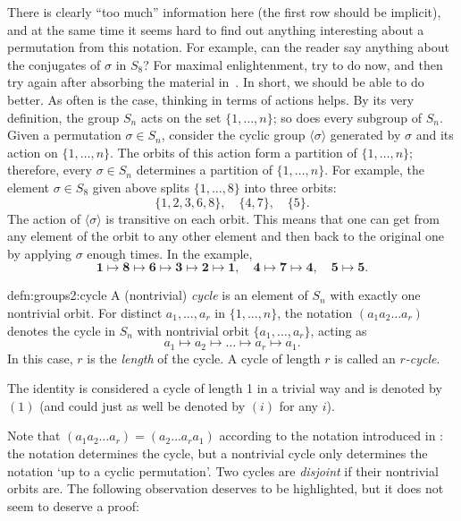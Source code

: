 There is clearly ``too much'' information here (the first row should
be implicit), and at the same time it seems hard to find out anything
interesting about a permutation from this notation. For example, can
the reader say anything about the conjugates of $\sigma$ in $S_8$? For
maximal enlightenment, try to do
 now, and then
try again after absorbing the material
in~. In short, we should be
able to do better.  As often is the case, thinking in terms of actions
helps. By its very definition, the group $S_n$ acts on the set
$\{1,\dots,n\}$; so does every subgroup of $S_n$. Given a permutation
$\sigma \in S_n$, consider the cyclic group $\langle\sigma\rangle$
generated by $\sigma$ and its action on $\{1,\dots,n\}$. The orbits of
this action form a partition of $\{1,\dots,n\}$; therefore, every
$\sigma \in S_n$ determines a partition of $\{1,\dots,n\}$. For
example, the element $\sigma \in S_8$ given above splits
$\{1,\dots,8\}$ into three orbits:
\[
  \{1,2,3,6,8\}, \quad \{4,7\}, \quad \{5\}.
\]
The action of $\langle\sigma\rangle$ is transitive on each orbit. This
means that one can get from any element of the orbit to any other
element and then back to the original one by applying $\sigma$ enough
times. In the example,
\[
  \mathbf{1} \mapsto \mathbf{8} \mapsto \mathbf{6} \mapsto \mathbf{3}
  \mapsto \mathbf{2} \mapsto \mathbf{1}, \quad \mathbf{4} \mapsto
  \mathbf{7} \mapsto \mathbf{4}, \quad \mathbf{5} \mapsto \mathbf{5}.
\]
\begin{defn}{}{defn:groups2:cycle}
  A (nontrivial) \emph{cycle} is an element of $S_n$ with exactly one
  nontrivial orbit. For distinct $a_1, \dots, a_r$ in $\{1,\dots,n\}$,
  the notation $(a_1 a_2 \dots a_r)$ denotes the cycle in $S_n$ with
  nontrivial orbit $\{a_1,\dots,a_r\}$, acting as
  \[
    a_1 \mapsto a_2 \mapsto \dots \mapsto a_r \mapsto a_1.
  \]
  In this case, $r$ is the \emph{length} of the cycle. A cycle of
  length $r$ is called an \emph{$r$-cycle}.
\end{defn}
The identity is considered a cycle of length 1 in a trivial way and is
denoted by $(1)$ (and could just as well be denoted by $(i)$ for any
$i$).

Note that $(a_1 a_2 \dots a_r) = (a_2 \dots a_r a_1)$ according to the
notation introduced in : the notation
determines the cycle, but a nontrivial cycle only determines the
notation `up to a cyclic permutation'.  Two cycles are \emph{disjoint}
if their nontrivial orbits are. The following observation deserves to
be highlighted, but it does not seem to deserve a proof:

